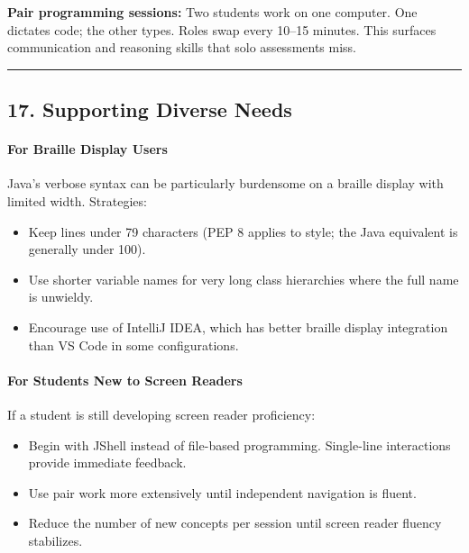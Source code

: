 \documentclass[
  justified,
  openright,
]{tufte-book}
\let\subsubsection\paragraph
\let\paragraph\paragraph
\let\subsubsection\paragraph
\let\paragraph\paragraph
\providecommand{\tightlist}{%
  \setlength{\itemsep}{0pt}\setlength{\parskip}{0pt}}
\begin{document}
\textbf{Pair programming sessions:} Two students work on one computer.
One dictates code; the other types. Roles swap every 10--15 minutes.
This surfaces communication and reasoning skills that solo assessments
miss.

\begin{center}\rule{0.5\linewidth}{0.5pt}\end{center}

\subsection{17. Supporting Diverse
Needs}\label{supporting-diverse-needs}

\subsubsection{For Braille Display
Users}\label{for-braille-display-users}

Java's verbose syntax can be particularly burdensome on a braille
display with limited width. Strategies:

\begin{itemize}
\tightlist
\item
  Keep lines under 79 characters (PEP 8 applies to style; the Java
  equivalent is generally under 100).
\item
  Use shorter variable names for very long class hierarchies where the
  full name is unwieldy.
\item
  Encourage use of IntelliJ IDEA, which has better braille display
  integration than VS Code in some configurations.
\end{itemize}

\subsubsection{For Students New to Screen
Readers}\label{for-students-new-to-screen-readers}

If a student is still developing screen reader proficiency:

\begin{itemize}
\tightlist
\item
  Begin with JShell instead of file-based programming. Single-line
  interactions provide immediate feedback.
\item
  Use pair work more extensively until independent navigation is fluent.
\item
  Reduce the number of new concepts per session until screen reader
  fluency stabilizes.
\end{itemize}
\end{document}
